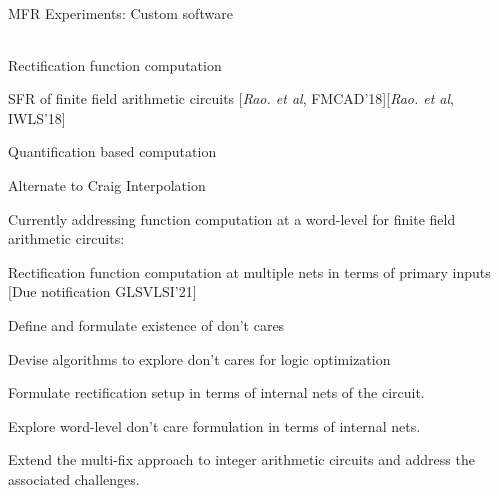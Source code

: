 \begin{frame}{\large MFR Experiments: Custom software}
{\begin{table}[]
\begin{tabular}{| c | c | c | c | c | c | c | c | c | c |}
\end{tabular}
\end{table}}
\end{frame}

\begin{frame}{\large Rectification function computation }

\bi
	\item SFR of finite field arithmetic circuits
		[{\it Rao. et al}, FMCAD'18][{\it Rao. et al}, IWLS'18]
	\bi
		\item Quantification based computation
		\item Alternate to Craig Interpolation  
	\ei
\vspace{0.1in}
\item Currently addressing function computation at a word-level for finite field arithmetic circuits: 
\bi
\item Rectification function computation at multiple nets in terms of primary inputs [Due notification GLSVLSI'21]
\bi
	\item Define and formulate existence of don't cares 
	\item Devise algorithms to explore don't cares for logic optimization 
\ei
\item Formulate rectification setup in terms of internal nets of the circuit. 
\bi
	\item Explore word-level don't care formulation in terms of internal nets.
\ei
\item Extend the multi-fix approach to integer arithmetic circuits and address the associated challenges.
\ei
\ei
\end{frame}


